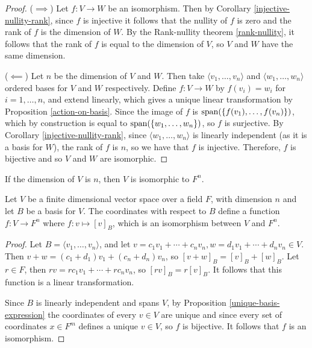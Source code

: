\begin{proof}\proofbreak
    ($\implies$) Let $f: V \to W$ be an isomorphism. Then by Corollary \ref{injective-nullity-rank}, since $f$ is injective it follows that the nullity of $f$ is zero and the rank of $f$ is the dimension of $W$. By the Rank-nullity theorem \ref{rank-nullity}, it follows that the rank of $f$ is equal to the dimension of $V$, so $V$ and $W$ have the same dimension.

    ($\impliedby$) Let $n$ be the dimension of $V$ and $W$. Then take $\langle v_1, \ldots, v_n \rangle$ and $\langle w_1, \ldots, w_n \rangle$ ordered bases for $V$ and $W$ respectively. Define $f: V \to W$ by $f(v_i) = w_i$ for $i = 1, \ldots, n$, and extend linearly, which gives a unique linear transformation by Proposition \ref{action-on-basis}. Since the image of $f$ is $\operatorname{span}(\{f(v_1), \ldots, f(v_n)\})$, which by construction is equal to $\operatorname{span}(\{w_1, \ldots, w_n\})$, so $f$ is surjective. By Corollary \ref{injective-nullity-rank}, since $\langle w_1, \ldots, w_n \rangle$ is linearly independent (as it is a basis for $W$), the rank of $f$ is $n$, so we have that $f$ is injective. Therefore, $f$ is bijective and so $V$ and $W$ are isomorphic.
\end{proof}

\begin{cor}
    If the dimension of $V$ is $n$, then $V$ is isomorphic to $F^n$.
\end{cor}

\begin{prop}\label{coordinates-are-isomorphism}
    Let $V$ be a finite dimensional vector space over a field $F$, with dimension $n$ and let $B$ be a basis for $V$. The coordinates with respect to $B$ define a function $f: V \to F^n$ where $f: v \mapsto [v]_B$, which is an isomorphism between $V$ and $F^n$.
\end{prop}

\begin{proof}
    Let $B = \langle v_1, \ldots, v_n\rangle$, and let $v = c_1v_1 + \cdots + c_nv_n, w = d_1v_1 + \cdots + d_nv_n \in V$. Then $v + w = (c_1 + d_1)v_1 + (c_n + d_n)v_n$, so $[v+w]_B = [v]_B + [w]_B$. Let $r \in F$, then $rv = rc_1v_1 + \cdots + rc_nv_n$, so $[rv]_B = r[v]_B$. It follows that this function is a linear transformation.

    Since $B$ is linearly independent and spans $V$, by Proposition \ref{unique-basis-expression} the coordinates of every $v \in V$ are unique and since every set of coordinates $x \in F^m$ defines a unique $v \in V$, so $f$ is bijective. It follows that $f$ is an isomorphism.
\end{proof}

